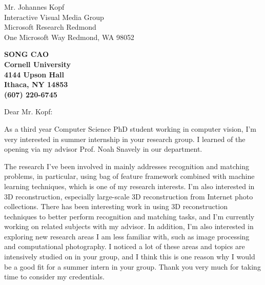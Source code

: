 \documentclass[11pt]{letter} %
\begin{document}
\signature{Song Cao}                  %
\longindentation=0pt                       %
\let\raggedleft\raggedright                %
 
\begin{letter}{Mr. Johannes Kopf\\
Interactive Visual Media Group\\
Microsoft Research Redmond \\
One Microsoft Way
Redmond, WA 98052} 

\begin{center}
\large\bf SONG CAO \\
Cornell University\\ 4144 Upson Hall \\ Ithaca, NY 14853 \\ (607) 220-6745
\end{center} 
\vfill %


 
\opening{Dear Mr. Kopf:} 
 
\noindent As a third year Computer Science PhD student working in computer vision, I'm very interested in summer internship in your research group. I learned of the opening via my advisor Prof. Noah Snavely in our department.

\noindent The research I've been involved in mainly addresses recognition and matching problems, in particular, using bag of feature framework combined with machine learning techniques, which is one of my research interests. I'm also interested in 3D reconstruction, especially large-scale 3D reconstruction from Internet photo collections. There has been interesting work in using 3D reconstruction techniques to better perform recognition and matching tasks, and I'm currently working on related subjects with my advisor. In addition, I'm also interested in exploring new research areas I am less familiar with, such as image processing and computational photography. I noticed a lot of these areas and topics are intensively studied on in your group, and I think this is one reason why I would be a good fit for a summer intern in your group. Thank you very much for taking time to consider my credentials.

 

\end{letter}
\end{document}
